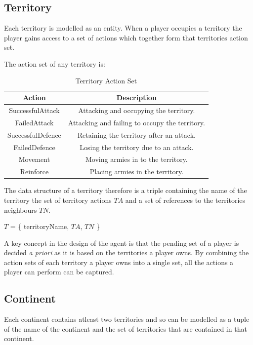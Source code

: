 \documentclass[parskip]{cs4rep}
\begin{document}
\subsection{Territory}

Each territory is modelled as an entity. When a player occupies a territory the player gains access to a set of actions which together form that territories action set.

The action set of any territory is:

\begin{table}[ht]
\centering
\begin{tabular}{|c|c|}
\hline 
\textbf{Action} & \textbf{Description} \\ 
\hline 
SuccessfulAttack & Attacking and occupying the territory.\\ 
\hline 
FailedAttack & Attacking and failing to occupy the territory.\\ 
\hline 
SuccessfulDefence & Retaining the territory after an attack.\\ 
\hline 
FailedDefence & Losing the territory due to an attack.\\
\hline
Movement & Moving armies in to the territory.\\
\hline  
Reinforce & Placing armies in the territory.\\
\hline 
\end{tabular}
\caption{Territory Action Set}
\label{table:continent-bonus}
\end{table}

\newpage

The data structure of a territory therefore is a triple containing the name of the territory the set of territory actions  $TA$ and a set of references to the territories neighbours $TN$.

\centerline{
$T$ = \{ territoryName, $TA$, $TN$ \} 
}

A key concept in the design of the agent is that the pending set of a player is decided \textit{a priori} as it is based on the territories a player owns. By combining the action sets of each territory a player owns into a single set, all the actions a player can perform can be captured.

\subsection{Continent}

Each continent contains atleast two territories and so can be modelled as a tuple of the name of the continent and the set of territories that are contained in that continent.
\end{document}

